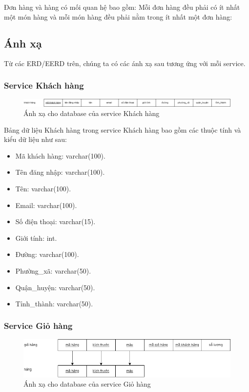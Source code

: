 Đơn hàng và hàng có mối quan hệ bao gồm: Mỗi đơn hàng đều phải có ít nhất một món hàng và mỗi món hàng đều phải nằm trong ít nhất một đơn hàng:


\subsection{Ánh xạ}
\par Từ các ERD/EERD trên, chúng ta có các ánh xạ sau tương ứng với mỗi service.

\subsubsection{Service Khách hàng}
\begin{figure}[!htp]
	\begin{center}
		\includegraphics[width=1\textwidth]{img/database/mapping/mapping-customer.png}
		\newline
		\caption{Ánh xạ cho database của service Khách hàng}
	\end{center}
\end{figure}

Bảng dữ liệu Khách hàng trong service Khách hàng bao gồm các thuộc tính và kiểu dữ liệu như sau:
\begin{itemize}
	\item Mã khách hàng: varchar(100).
	\item Tên đăng nhập: varchar(100).
	\item Tên: varchar(100).
	\item Email: varchar(100).
	\item Số điện thoại: varchar(15).
	\item Giới tính: int.
	\item Đường: varchar(100).
	\item Phường\_xã: varchar(50).
	\item Quận\_huyện: varchar(50).
	\item Tỉnh\_thành: varchar(50).
\end{itemize}

\subsubsection{Service Giỏ hàng}
\begin{figure}[!htp]
	\begin{center}
		\includegraphics[width=12cm]{img/database/mapping/mapping-cart.png}
		\newline
		\caption{Ánh xạ cho database của service Giỏ hàng}
	\end{center}
\end{figure}

